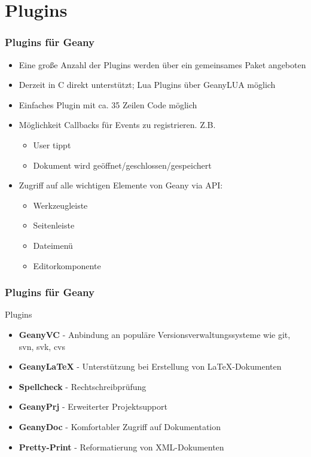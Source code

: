 \section{Plugins}
\begin{frame}
  \frametitle{Plugins für Geany}
  \begin{block}{}
    \begin{itemize}
    \item Eine große Anzahl der Plugins werden über ein gemeinsames
      Paket angeboten
    \item Derzeit in C direkt unterstützt; Lua Plugins über GeanyLUA
      möglich
    \item Einfaches Plugin mit ca. 35 Zeilen Code möglich
    \item Möglichkeit Callbacks für Events zu registrieren. Z.B.
      \begin{itemize}
      \item User tippt
      \item Dokument wird geöffnet/geschlossen/gespeichert
      \end{itemize}
    \item Zugriff auf alle wichtigen Elemente von Geany via API:
      \begin{itemize}
      \item Werkzeugleiste
      \item Seitenleiste
      \item Dateimenü
      \item Editorkomponente
      \end{itemize}
    \end{itemize}
  \end{block}
\end{frame}

\begin{frame}
  \frametitle{Plugins für Geany}
  \begin{block}{Plugins}
    \begin{itemize}
    \item \textbf{GeanyVC} - Anbindung an populäre
      Versions\-ver\-waltungs\-systeme wie git, svn, svk, cvs
    \item \textbf{GeanyLaTeX} - Unterstützung bei Erstellung von
      \LaTeX-Dokumenten
    \item \textbf{Spellcheck} - Rechtschreibprüfung
    \item \textbf{GeanyPrj} - Erweiterter Projektsupport
    \item \textbf{GeanyDoc} - Komfortabler Zugriff auf Dokumentation
    \item \textbf{Pretty-Print} - Reformatierung von XML-Dokumenten
    \end{itemize}
  \end{block}
\end{frame}

